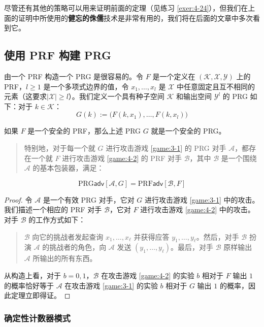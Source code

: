 尽管还有其他的策略可以用来证明前面的定理（见练习 \ref{exer:4-24}），但我们在上面的证明中所使用的\textbf{健忘的侏儒}技术是非常有用的，我们将在后面的文章中多次看到它。

\subsection{使用 PRF 构建 PRG}\label{subsec:4-4-4}

由一个 PRF 构造一个 PRG 是很容易的。令 $F$ 是一个定义在 $(\mathcal{K},\mathcal{X},\mathcal{Y})$ 上的 PRF，$l\geq1$ 是一个多项式边界的值，令 $x_1,\dots,x_l$ 是 $\mathcal{X}$ 中任意固定且互不相同的元素（这要求$|\mathcal{X}|\geq l$）。我们定义一个具有种子空间 $\mathcal{K}$ 和输出空间 $\mathcal{Y}^l$ 的 PRG 如下：对于 $k\in\mathcal{K}$：
\[
G(k):=
\big(
F(k,x_1),\dots,F(k,x_l)
\big)
\]

\begin{theorem}\label{theo:4-8}
如果 $F$ 是一个安全的 PRF，那么上述 PRG $G$ 就是一个安全的 PRG。
\begin{quote}
特别地，对于每一个就 $G$ 进行攻击游戏 \ref{game:3-1} 的 PRG 对手 $\mathcal{A}$，都存在一个就 $F$ 进行攻击游戏 \ref{game:4-2} 的 PRF 对手 $\mathcal{B}$，其中 $\mathcal{B}$ 是一个围绕 $\mathcal{A}$ 的基本包装器，满足：
\end{quote}
\[
\mathrm{PRG}\mathsf{adv}[\mathcal{A},G]= 
\mathrm{PRF}\mathsf{adv}[\mathcal{B},F]
\]
\end{theorem}

\begin{proof}
令 $\mathcal{A}$ 是一个有效 PRG 对手，它对 $G$ 进行攻击游戏 \ref{game:3-1} 中的攻击。我们描述一个相应的 PRF 对手 $\mathcal{B}$，它对 $F$ 进行攻击游戏 \ref{game:4-2} 中的攻击。对手 $\mathcal{B}$ 的工作方式如下：
\begin{quote}
$\mathcal{B}$ 向它的挑战者发起查询 $x_1,\dots,x_\ell$ 并获得应答 $y_1,\dots,y_\ell$。然后，对手 $\mathcal{B}$ 扮演 $\mathcal{A}$ 的挑战者的角色，向 $\mathcal{A}$ 发送 $(y_1,\dots,y_\ell)$。最后，对手 $\mathcal{B}$ 原样输出 $\mathcal{A}$ 所输出的所有东西。
\end{quote}

从构造上看，对于 $b=0,1$，$\mathcal{B}$ 在攻击游戏 \ref{game:4-2} 的实验 $b$ 相对于 $F$ 输出 $1$ 的概率恰好等于 $\mathcal{A}$ 在攻击游戏 \ref{game:3-1} 的实验 $b$ 相对于 $G$ 输出 $1$ 的概率，因此定理立即得证。
\end{proof}

\subsubsection{确定性计数器模式}

